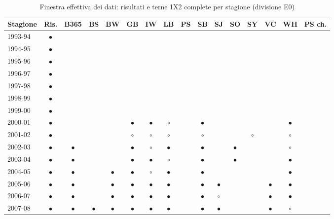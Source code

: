 \begin{table}[htbp]
\centering
\footnotesize
\setlength{\tabcolsep}{2.5pt}
\caption{Finestra effettiva dei dati: risultati e terne 1X2 complete per stagione (divisione E0)}
\label{tab:finestra_dati}
\begin{tabular}{lccccccccccccccc}
\toprule
Stagione & Ris. & B365 & BS & BW & GB & IW & LB & PS & SB & SJ & SO & SY & VC & WH & PS ch. \\
\midrule
1993-94 & $\bullet$ &  &  &  &  &  &  &  &  &  &  &  &  &  &  \\
1994-95 & $\bullet$ &  &  &  &  &  &  &  &  &  &  &  &  &  &  \\
1995-96 & $\bullet$ &  &  &  &  &  &  &  &  &  &  &  &  &  &  \\
1996-97 & $\bullet$ &  &  &  &  &  &  &  &  &  &  &  &  &  &  \\
1997-98 & $\bullet$ &  &  &  &  &  &  &  &  &  &  &  &  &  &  \\
1998-99 & $\bullet$ &  &  &  &  &  &  &  &  &  &  &  &  &  &  \\
1999-00 & $\bullet$ &  &  &  &  &  &  &  &  &  &  &  &  &  &  \\
2000-01 & $\bullet$ &  &  &  & $\bullet$ & $\bullet$ & $\circ$ &  & $\bullet$ &  &  &  &  & $\bullet$ &  \\
2001-02 & $\bullet$ &  &  &  & $\circ$ & $\circ$ & $\circ$ &  & $\circ$ &  &  & $\circ$ &  & $\circ$ &  \\
2002-03 & $\bullet$ & $\bullet$ &  &  & $\bullet$ & $\circ$ & $\bullet$ &  & $\bullet$ &  & $\bullet$ &  &  & $\circ$ &  \\
2003-04 & $\bullet$ & $\bullet$ &  &  & $\bullet$ & $\bullet$ & $\circ$ &  & $\bullet$ &  & $\bullet$ &  &  & $\bullet$ &  \\
2004-05 & $\bullet$ & $\bullet$ &  & $\bullet$ & $\bullet$ & $\circ$ & $\bullet$ &  & $\bullet$ &  &  &  &  & $\bullet$ &  \\
2005-06 & $\bullet$ & $\bullet$ &  & $\bullet$ & $\bullet$ & $\bullet$ & $\bullet$ &  & $\bullet$ & $\bullet$ &  &  & $\bullet$ & $\bullet$ &  \\
2006-07 & $\bullet$ & $\bullet$ &  & $\bullet$ & $\bullet$ & $\bullet$ & $\bullet$ &  & $\bullet$ & $\circ$ &  &  & $\bullet$ & $\bullet$ &  \\
2007-08 & $\bullet$ & $\bullet$ & $\bullet$ & $\bullet$ & $\bullet$ & $\bullet$ & $\bullet$ &  & $\bullet$ & $\bullet$ &  &  & $\bullet$ & $\circ$ &  \\

\end{tabular}
\end{table}

